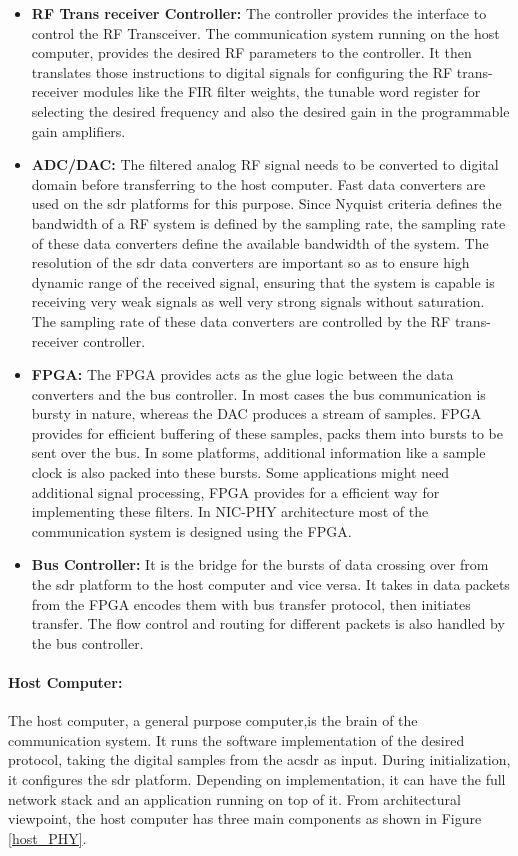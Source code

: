 \begin{itemize}
\item{\textbf{\ac{RF} Trans receiver Controller:} The controller provides the interface to control the \ac{RF} Transceiver.
The communication system running on the host computer, provides the desired RF parameters to the controller.
It then translates those instructions to digital signals for configuring the RF trans-receiver modules like the \ac{FIR} filter weights, the tunable word register for selecting the desired frequency and also the desired gain in the programmable gain amplifiers.
}

\item{\textbf{ADC/DAC:} The filtered analog \ac{RF} signal needs to be converted to digital domain before transferring to the host computer.
Fast data converters are used on the \ac{sdr} platforms for this purpose.
Since Nyquist criteria defines the bandwidth of a \ac{RF} system is defined by the sampling rate, the sampling rate of these data converters define the available bandwidth of the system.
The resolution of the \ac{sdr} data converters are important so as to ensure high dynamic range of the received signal, ensuring that the system is capable is receiving very weak signals as well very strong signals without saturation.
The sampling rate of these data converters are controlled by the \ac{RF} trans-receiver controller.
}
\item{\textbf{\ac{FPGA}:} The \ac{FPGA} provides acts as the glue logic between the data converters and the bus controller.
In most cases the bus communication is bursty in nature, whereas the \ac{DAC} produces a stream of samples.
\ac{FPGA} provides for efficient buffering of these samples, packs them into bursts to be sent over the bus.
In some platforms, additional information like a sample clock is also packed into these bursts.
Some applications might need additional signal processing, \ac{FPGA} provides for a efficient way for implementing these filters.
In NIC-PHY architecture most of the communication system is designed using the \ac{FPGA}.
}
\item{\textbf{Bus Controller:} It is the bridge for the bursts of data crossing over from the \ac{sdr} platform to the host computer and vice versa.
It takes in data packets from the \ac{FPGA} encodes them with bus transfer protocol, then initiates transfer.
The flow control and routing for different packets is also handled by the bus controller.}
\end{itemize}

\paragraph{Host Computer:} The host computer, a general purpose computer,is the brain of the communication system.
It runs the software implementation of the desired protocol, taking the digital samples from the ac{sdr} as input.
During initialization, it configures the \ac{sdr} platform.
Depending on implementation, it can have the full network stack and an application running on top of it.
From architectural viewpoint, the host computer has three main components as shown in Figure \ref{host_PHY}.

